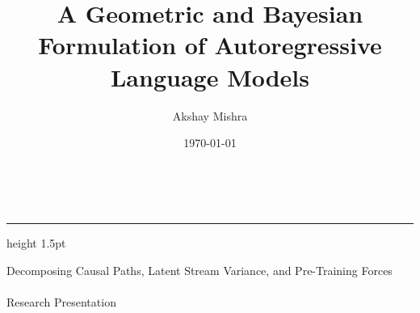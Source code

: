\documentclass[aspectratio=169, 11pt]{beamer}
\title{A Geometric and Bayesian Formulation of Autoregressive Language Models}
\author{Akshay Mishra}
\date{\today}
\begin{document}
\begin{frame}[plain]
    \centering
    \vfill
    \begin{minipage}{\textwidth}
        \centering
        \vspace{1cm}
        {\color{primary}\inserttitle}\\[0.4cm]
        {\color{primary!80}\hrule height 1.5pt}\vspace{0.4cm}
        {\color{textdark!85}\large Decomposing Causal Paths, Latent Stream Variance, and Pre-Training Forces}\\[0.8cm]
        {\color{secondary}\insertauthor}\\[0.2cm]
        {\color{textdark!60}\small Research Presentation}
    \end{minipage}
    \vfill
\end{frame}
\end{document}
